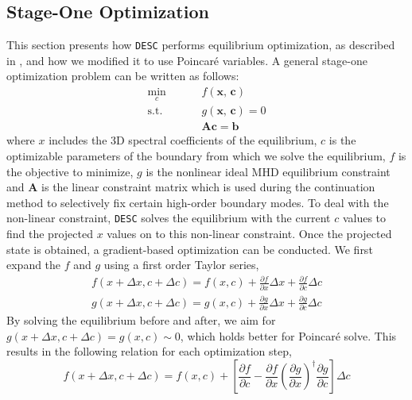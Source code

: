 \documentclass{jpp}
\newcommand{\dx}{\Delta x}
\newcommand{\dc}{\Delta c}
\begin{document}
\subsection{Stage-One Optimization}\label{sec:stage1}
This section presents how \texttt{DESC} performs equilibrium optimization, as described in \citep{dudtDESCStellaratorCode2023}, and how we modified it to use Poincaré variables. A general stage-one optimization problem can be written as follows:
\begin{equation}
    \begin{split}
        \min_{c} \hspace{1cm} &f(\textbf{x, c}) \\
        \text{s.t. } \hspace{1cm} &g(\textbf{x, c}) = 0\\
        &\mathbf{Ac} = \mathbf{b}
    \end{split}
\end{equation}
where $x$ includes the 3D spectral coefficients of the equilibrium, $c$ is the optimizable parameters of the boundary from which we solve the equilibrium, $f$ is the objective to minimize, $g$ is the nonlinear ideal MHD equilibrium constraint and $\mathbf{A}$ is the linear constraint matrix which is used during the continuation method to selectively fix certain high-order boundary modes. To deal with the non-linear constraint, \texttt{DESC} solves the equilibrium with the current $c$ values to find the projected $x$ values on to this non-linear constraint. Once the projected state is obtained, a gradient-based optimization can be conducted. We first expand the $f$ and $g$ using a first order Taylor series,
\begin{align}
    f(x + \dx,c + \dc) = f(x, c) + \frac{\partial f}{\partial x} \dx + \frac{\partial f}{\partial c} \dc \label{f_taylor}\\
    g(x + \dx,c + \dc) = g(x, c) + \frac{\partial g}{\partial x} \dx + \frac{\partial g}{\partial c} \dc \label{g_taylor}
\end{align}
By solving the equilibrium before and after, we aim for $g(x + \dx,c + \dc) = g(x, c) \sim 0$, which holds better for Poincaré solve. This results in the following relation for each optimization step,
\begin{equation}
    f(x + \dx,c + \dc) = f(x, c) + \left[ \frac{\partial f}{\partial c} - \frac{\partial f}{\partial x} \left( \frac{\partial g}{\partial x} \right) ^{\dagger} \frac{\partial g}{\partial c} \right] \dc \label{g_linear}
\end{equation}
\end{document}
